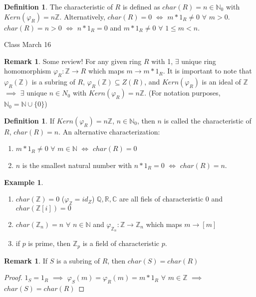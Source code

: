 \documentclass[11pt]{article}
\theoremstyle{definition}
\newtheorem{definition}[thm]{Definition}
\newtheorem{example}[thm]{Example}
\newtheorem{remark}[thm]{Remark}
\numberwithin{equation}{section}
\newcommand{\R}{\mathbb{R}}  %
\newcommand{\Q}{\mathbb{Q}}  %
\newcommand{\C}{\mathbb{C}}  %
\newcommand{\Z}{\mathbb{Z}}
\newcommand{\N}{\mathbb{N}} %
\begin{document}
\begin{definition}
The characteristic of $R$ is defined as $char(R) = n \in \N_0$ with $Kern(\varphi_{R}) = n\Z$. Alternatively, $char(R) = 0$ $\Leftrightarrow$ $m*1_{R} \neq 0$ $\forall$ $m > 0$. $char(R) = n > 0$ $\Leftrightarrow$ $n*1_{R} = 0$ and $m*1_{R} \neq 0$ $\forall$ $1 \leq m < n$.
\end{definition}

\begin{center}
{\sf\LARGE Class March 16}
\end{center}

\begin{remark}
Some review! For any given ring $R$ with 1, $\exists$ unique ring homomorphism $\varphi_{R}:\Z \rightarrow R$ which maps $m \rightarrow m*1_{R}$. It is important to note that $\varphi_{R}(\Z)$ is a subring of $R$, $\varphi_{R}(\Z) \subseteq Z(R)$, and $Kern(\varphi_{R})$ is an ideal of $\Z$ $\implies$ $\exists$ unique $n \in N_{0}$ with $Kern(\varphi_{R}) = n\Z$. (For notation purposes, $\N_0 = \N \cup \{0\}$)
\end{remark}

\begin{definition}
If $Kern(\varphi_{R}) = n\Z$, $n \in \N_{0}$, then $n$ is called the characteristic of $R$, $char(R) = n$. An alternative characterization:
\begin{enumerate}
    \item $m*1_{R} \neq 0$ $\forall$ $m \in \N$ $\Leftrightarrow$ $char(R) = 0$
    \item $n$ is the smallest natural number with $n*1_{R} = 0$ $\Leftrightarrow$ $char(R) = n$.
\end{enumerate}
\end{definition}

\begin{example}
\begin{enumerate}
    \item $char(\Z) = 0$ ($\varphi_{\Z} = id_{Z}$) $\Q, \R, \C$ are all fiels of characteristic $0$ and $char(\Z[i]) = 0$
    \item $char(\Z_{n}) = n$ $\forall$ $n \in \N$ and $\varphi_{\Z_{n}}:\Z \rightarrow \Z_{n}$ which maps $m \rightarrow [m]$
    \item if $p$ is prime, then $\Z_{p}$ is a field of characteristic $p$.
\end{enumerate}
\end{example}

\begin{remark}
If $S$ is a subring of $R$, then $char(S) = char(R)$
\end{remark}
\begin{proof}
$1_{S} = 1_{R}$ $\implies$ $\varphi_{S}(m) = \varphi_{R}(m) = m*1_{R}$ $\forall$ $m \in \Z$ $\implies$ $char(S) = char(R)$
\end{proof}
\end{document}
